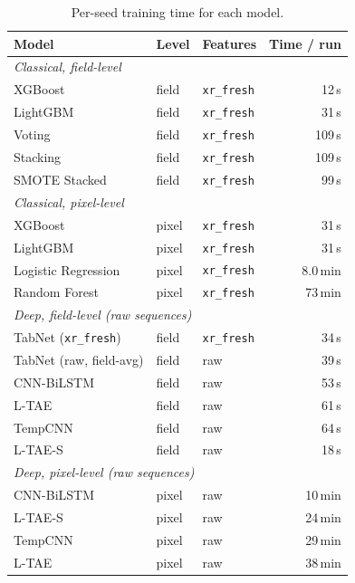 \documentclass[journal]{IEEEtran}
\begin{document}
\begin{table}[!t]
\centering
\scriptsize
\caption{Per-seed training time for each model.}
\label{stab:cost}
\renewcommand{\arraystretch}{1.12}
\setlength{\tabcolsep}{6pt}
\begin{tabular}{lllr}
\toprule
\textbf{Model} & \textbf{Level} & \textbf{Features} & \textbf{Time / run} \\
\midrule
\multicolumn{4}{l}{\emph{Classical, field-level}}\\
XGBoost                & field & \texttt{xr\_fresh} & 12\,s \\
LightGBM               & field & \texttt{xr\_fresh} & 31\,s \\
Voting                 & field & \texttt{xr\_fresh} & 109\,s \\
Stacking               & field & \texttt{xr\_fresh} & 109\,s \\
SMOTE Stacked          & field & \texttt{xr\_fresh} & 99\,s \\
\midrule
\multicolumn{4}{l}{\emph{Classical, pixel-level}}\\
XGBoost                & pixel & \texttt{xr\_fresh} & 31\,s \\
LightGBM               & pixel & \texttt{xr\_fresh} & 31\,s \\
Logistic Regression    & pixel & \texttt{xr\_fresh} & 8.0\,min \\
Random Forest          & pixel & \texttt{xr\_fresh} & 73\,min \\
\midrule
\multicolumn{4}{l}{\emph{Deep, field-level (raw sequences)}}\\
TabNet (\texttt{xr\_fresh}) & field & \texttt{xr\_fresh} & 34\,s \\
TabNet (raw, field-avg) & field & raw & 39\,s \\
CNN-BiLSTM             & field & raw & 53\,s \\
L-TAE                  & field & raw & 61\,s \\
TempCNN                & field & raw & 64\,s \\
L-TAE-S                & field & raw & 18\,s \\
\midrule
\multicolumn{4}{l}{\emph{Deep, pixel-level (raw sequences)}}\\
CNN-BiLSTM             & pixel & raw & 10\,min \\
L-TAE-S                & pixel & raw & 24\,min \\
TempCNN                & pixel & raw & 29\,min \\
L-TAE                  & pixel & raw & 38\,min \\

\end{tabular}
\end{table}
\end{document}
